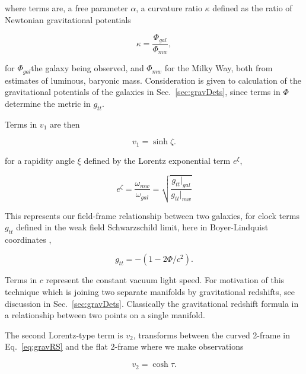 \documentclass[reprint,%
 amsmath,amssymb,
 aps,
]{revtex4-1}
\begin{document}
where terms are, a free parameter $\alpha$,  a curvature ratio $\kappa$  defined as the ratio of Newtonian gravitational potentials 

 \begin{equation}
\kappa=\frac{\Phi_{gal}}{\Phi_{mw}}, 
\label{eq:kappa2}  
\end{equation}  

 for $\Phi_{gal}$the   galaxy being observed, and $\Phi_{mw}$ for  the Milky Way, both from estimates of luminous, baryonic mass.  
 Consideration is given to calculation of  the  gravitational potentials of   the galaxies in Sec.~\ref{sec:gravDets},   since terms in $\Phi$ determine the metric in $g_{tt}$. 


 
    
 Terms in $v_1$   are then 
 
   \begin{equation}
       v_1 = \sinh \zeta. 
   \end{equation}
 
 for a rapidity angle $\xi$ defined by the    Lorentz exponential  term  $e^\xi$, 
  
   
     \begin{equation}
     e^{\zeta}=  \frac{\omega_{mw}}{\omega_{gal}}  =\sqrt{\frac{g_{tt}|_{gal}}{g_{tt}|_{mw}}}
      \label{eq:gravRS}
    \end{equation}
    
This  represents our field-frame relationship between two galaxies, for  
     clock terms $g_{tt}$ defined in the   weak field Schwarzschild limit, here in  Boyer-Lindquist coordinates \cite{Hartle}, 
 
  \begin{equation}
      g_{tt}= -( 1 - 2\Phi/ c^2).
      \label{clocktime}
  \end{equation} 
  
Terms in  $c$ represent  the constant vacuum light speed.    For  motivation of this    technique which is joining two separate manifolds by gravitational redshifts,  see discussion   in  Sec.~\ref{sec:gravDets}.  Classically the gravitational redshift formula in a relationship between two points on a single manifold. 




The second Lorentz-type term is $v_2$,   transforms between the  curved 2-frame in Eq.~\ref{eq:gravRS} and  the flat 2-frame where we make observations

\begin{equation}
v_{2} =  \cosh \tau.
\label{eq:hyperbolico}
\end{equation}
 
\end{document}

